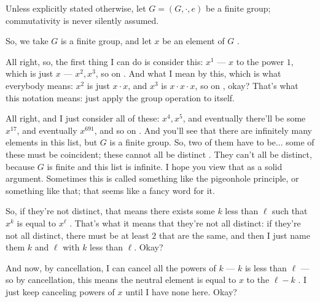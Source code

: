 \begin{content}
Unless explicitly stated otherwise, let $G = (G, \cdot, e)$ be a finite group; commutativity is never silently assumed.

\end{content}

\begin{speech}[01:18:13 - 01:20:22]
So, we take $G$ is a finite group, and let $x$ be an element of $G$ .

All right, so, the first thing I can do is consider this: $x^1$ --- $x$ to the power $1$, which is just $x$ --- $x^2, x^3$, so on . And what I mean by this, which is what everybody means: $x^2$ is just $x \cdot x$, and $x^3$ is $x \cdot x \cdot x$, so on , okay? That's what this notation means: just apply the group operation to itself.

All right, and I just consider all of these: $x^4, x^5$, and eventually there'll be some $x^{17}$, and eventually $x^{691}$, and so on . And you'll see that there are infinitely many elements in this list, but $G$ is a finite group. So, two of them have to be... some of these must be coincident; these cannot all be distinct . They can't all be distinct, because $G$ is finite and this list is infinite. I hope you view that as a solid argument. Sometimes this is called something like the pigeonhole principle, or something like that; that seems like a fancy word for it.

So, if they're not distinct, that means there exists some $k$ less than $\ell$ such that $x^k$ is equal to $x^\ell$ . That's what it means that they're not all distinct: if they're not all distinct, there must be at least $2$ that are the same, and then I just name them $k$ and $\ell$ with $k$ less than $\ell$. Okay?

And now, by cancellation, I can cancel all the powers of $k$ --- $k$ is less than $\ell$ --- so by cancellation, this means the neutral element is equal to $x$ to the $\ell - k$ . I just keep canceling powers of $x$ until I have none here. Okay?
\end{speech}

